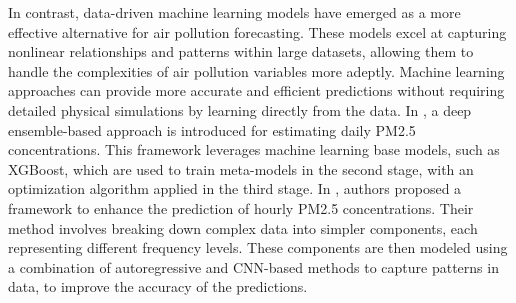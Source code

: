 In contrast, data-driven machine learning models \citep{yu2022deep, cai2023forecasting, bodnar2024aurora} have emerged as a more effective alternative for air pollution forecasting. These models excel at capturing nonlinear relationships and patterns within large datasets, allowing them to handle the complexities of air pollution variables more adeptly. Machine learning approaches can provide more accurate and efficient predictions without requiring detailed physical simulations by learning directly from the data. 
In \cite{yu2022deep}, a deep ensemble-based approach is introduced for estimating daily PM2.5 concentrations. This framework leverages machine learning base models, such as XGBoost, which are used to train meta-models in the second stage, with an optimization algorithm applied in the third stage.
In \cite{cai2023forecasting}, authors proposed a framework to enhance the prediction of hourly PM2.5 concentrations. Their method involves breaking down complex data into simpler components, each representing different frequency levels. These components are then modeled using a combination of autoregressive and CNN-based methods to capture patterns in data, to improve the accuracy of the predictions.


